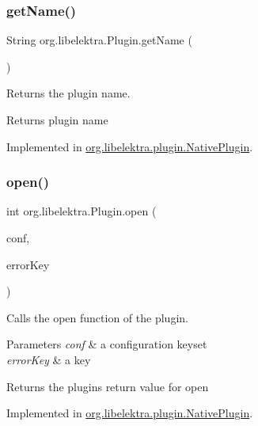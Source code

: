 \subsubsection{\texorpdfstring{get\+Name()}{getName()}}
{\footnotesize\ttfamily String org.\+libelektra.\+Plugin.\+get\+Name (\begin{DoxyParamCaption}{ }\end{DoxyParamCaption})}



Returns the plugin name. 

\begin{DoxyReturn}{Returns}
plugin name 
\end{DoxyReturn}


Implemented in \hyperlink{classorg_1_1libelektra_1_1plugin_1_1NativePlugin_a606fc8f54bc810d874176103859976ab}{org.\+libelektra.\+plugin.\+Native\+Plugin}.

\mbox{\label{interfaceorg_1_1libelektra_1_1Plugin_a740f0602ea62e7a28c86fc801add8907}} 
\subsubsection{\texorpdfstring{open()}{open()}}
{\footnotesize\ttfamily int org.\+libelektra.\+Plugin.\+open (\begin{DoxyParamCaption}\item[{\hyperlink{classorg_1_1libelektra_1_1KeySet}{Key\+Set}}]{conf,  }\item[{\hyperlink{classorg_1_1libelektra_1_1Key}{Key}}]{error\+Key }\end{DoxyParamCaption})}



Calls the open function of the plugin. 


\begin{DoxyParams}{Parameters}
{\em conf} & a configuration keyset \\
\hline
{\em error\+Key} & a key \\
\hline
\end{DoxyParams}
\begin{DoxyReturn}{Returns}
the plugin\textquotesingle{}s return value for open 
\end{DoxyReturn}


Implemented in \hyperlink{classorg_1_1libelektra_1_1plugin_1_1NativePlugin_a81510de92e0d65784e877bf53b89756a}{org.\+libelektra.\+plugin.\+Native\+Plugin}.

